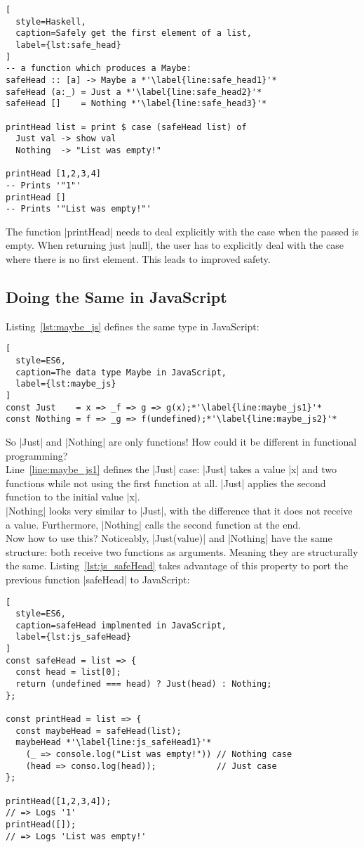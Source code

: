 \begin{lstlisting}[
  style=Haskell,
  caption=Safely get the first element of a list,
  label={lst:safe_head}
]
-- a function which produces a Maybe:
safeHead :: [a] -> Maybe a *'\label{line:safe_head1}'*
safeHead (a:_) = Just a *'\label{line:safe_head2}'*
safeHead []    = Nothing *'\label{line:safe_head3}'*

printHead list = print $ case (safeHead list) of 
  Just val -> show val
  Nothing  -> "List was empty!"

printHead [1,2,3,4]
-- Prints '"1"'
printHead []
-- Prints '"List was empty!"'
\end{lstlisting}

The function |printHead| needs to deal explicitly with the case when the passed
is empty. When returning just |null|, the user has to explicitly deal with the
case where there is no first element. This leads to improved safety.

\subsection{Doing the Same in JavaScript} %
\label{sub:Doing the same in JavaScript}
Listing~\ref{lst:maybe_js} defines the same type in JavaScript:
\begin{lstlisting}[
  style=ES6,
  caption=The data type Maybe in JavaScript,
  label={lst:maybe_js}
]
const Just    = x => _f => g => g(x);*'\label{line:maybe_js1}'*
const Nothing = f => _g => f(undefined);*'\label{line:maybe_js2}'*
\end{lstlisting}

So |Just| and |Nothing| are only functions! How could it be different in
functional programming? \\ 
Line~\ref{line:maybe_js1} defines the |Just| case:
|Just| takes a value |x| and two functions while not using the first function
at all. |Just| applies the second function to the initial value |x|. \\ 
|Nothing| looks very similar to |Just|, with the difference that it does not
receive a value. Furthermore, |Nothing| calls the second function at the end.\\ 
Now how to use this? Noticeably, |Just(value)| and |Nothing| have the same
structure: both receive two functions as arguments. Meaning they are
structurally the same. Listing~\ref{lst:js_safeHead} takes advantage of this
property to port the previous function |safeHead| to JavaScript:

\begin{lstlisting}[
  style=ES6,
  caption=safeHead implmented in JavaScript,
  label={lst:js_safeHead}
]
const safeHead = list => {
  const head = list[0];
  return (undefined === head) ? Just(head) : Nothing;
};

const printHead = list => {
  const maybeHead = safeHead(list);
  maybeHead *'\label{line:js_safeHead1}'*
    (_ => console.log("List was empty!")) // Nothing case
    (head => conso.log(head));            // Just case
};

printHead([1,2,3,4]);
// => Logs '1'
printHead([]);
// => Logs 'List was empty!'
\end{lstlisting}

